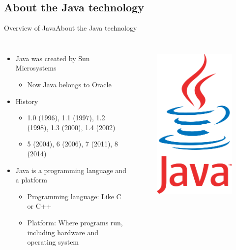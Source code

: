 \documentclass[10pt,compress]{beamer} %
\begin{document}
\subsection[About the Java technology]{About the Java technology}
\begin{frame}{Overview of Java}{About the Java technology}
    \begin{columns}
  		  \begin{itemize}
			\item Java was created by Sun Microsystems
		   	\begin{itemize}
				\item Now Java belongs to Oracle
		  	\end{itemize}

			\item History
		   	\begin{itemize}
				\item 1.0 (1996), 1.1 (1997), 1.2 (1998), 1.3 (2000), 1.4 (2002)
				\item 5 (2004), 6 (2006), 7 (2011), 8 (2014)
		  	\end{itemize}
		\item Java is a programming language and a platform
	    	\begin{itemize}
			\item Programming language: Like C or C++
			\item Platform: Where programs run, including hardware and operating system
	    	\end{itemize}
		  	\end{itemize}
   	 	\begin{figure}[t]
		\begin{center}
		    \includegraphics[width=0.6\linewidth]{figs/java}\\

\end{center}
\end{figure}
\end{columns}
\end{frame}
\end{document}
